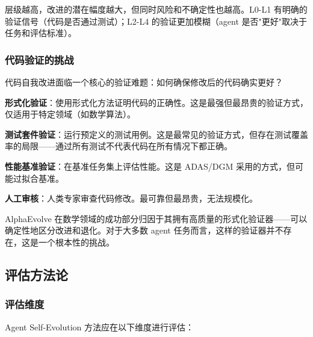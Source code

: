 层级越高，改进的潜在幅度越大，但同时风险和不确定性也越高。L0-L1 有明确的验证信号（代码是否通过测试）；L2-L4 的验证更加模糊（agent 是否"更好"取决于任务和评估标准）。

\subsubsection{代码验证的挑战}

代码自我改进面临一个核心的验证难题：如何确保修改后的代码确实更好？

\textbf{形式化验证}：使用形式化方法证明代码的正确性。这是最强但最昂贵的验证方式，仅适用于特定领域（如数学算法）。

\textbf{测试套件验证}：运行预定义的测试用例。这是最常见的验证方式，但存在测试覆盖率的局限——通过所有测试不代表代码在所有情况下都正确。

\textbf{性能基准验证}：在基准任务集上评估性能。这是 ADAS/DGM 采用的方式，但可能过拟合基准。

\textbf{人工审核}：人类专家审查代码修改。最可靠但最昂贵，无法规模化。

AlphaEvolve 在数学领域的成功部分归因于其拥有高质量的形式化验证器——可以确定性地区分改进和退化。对于大多数 agent 任务而言，这样的验证器并不存在，这是一个根本性的挑战。

\subsection{评估方法论}\label{sec:ch3-evaluation}

\subsubsection{评估维度}

Agent Self-Evolution 方法应在以下维度进行评估：

